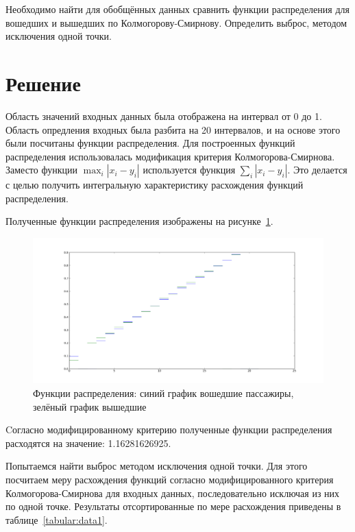 \documentclass[12pt,a4paper,oneside]{extarticle}
\begin{document}
    Необходимо найти для обобщённых данных сравнить функции распределения для вошедших и вышедших по Колмогорову-Смирнову. Определить выброс, методом исключения одной точки.

\section{Решение}
    Область значений входных данных была отображена на интервал от 0 до 1. Область опредления входных была разбита на 20 интервалов, и на основе этого были посчитаны функции распределения.
    Для построенных функций распределения использовалась модификация критерия Колмогорова-Смирнова. Заместо функции $\max_i|x_i-y_i|$ используется функция $\sum_{i}|x_i-y_i|$. Это делается с целью получить интегральную характеристику расхождения функций распределения.

    Полученные функции распределения изображены на рисунке~\ref{pic:case1}.
    \begin{figure}[ht!]
    \center
        \includegraphics[scale=0.45]{figure_1.png}
        \caption{Функции распределения: синий график вошедшие пассажиры, зелёный график вышедшие}
        \label{pic:case1}
    \end{figure}
    Cогласно модифицированному критерию полученные функции распределения расходятся на значение: 1.16281626925.

    Попытаемся найти выброс методом исключения одной точки. Для этого посчитаем меру расхождения функций согласно модифицированного критерия Колмогорова-Смирнова для входных данных, последовательно исключая из них по одной точке. Результаты отсортированные по мере расхождения приведены в таблице~\ref{tabular:data1}.
\end{document}
